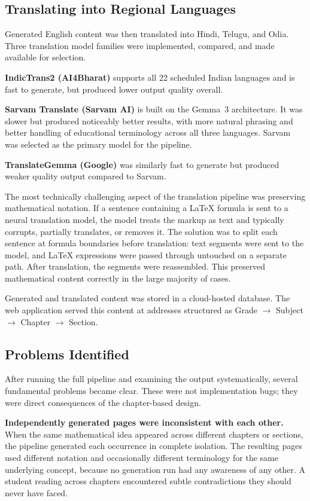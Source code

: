 \documentclass[12pt,a4paper]{article}
\begin{document}
\subsection{Translating into Regional Languages}

Generated English content was then translated into Hindi, Telugu, and Odia.
Three translation model families were implemented, compared, and made available
for selection.

\medskip
\noindent\textbf{IndicTrans2 (AI4Bharat)} supports all 22 scheduled Indian languages
and is fast to generate, but produced lower output quality overall.

\medskip
\noindent\textbf{Sarvam Translate (Sarvam AI)} is built on the Gemma~3 architecture.
It was slower but produced noticeably better results, with more natural phrasing
and better handling of educational terminology across all three languages.
Sarvam was selected as the primary model for the pipeline.

\medskip
\noindent\textbf{TranslateGemma (Google)} was similarly fast to generate
but produced weaker quality output compared to Sarvam.

\medskip
The most technically challenging aspect of the translation pipeline was preserving
mathematical notation.
If a sentence containing a \LaTeX{} formula is sent to a neural translation model,
the model treats the markup as text and typically corrupts, partially translates,
or removes it.
The solution was to split each sentence at formula boundaries before translation:
text segments were sent to the model, and \LaTeX{} expressions were passed through
untouched on a separate path.
After translation, the segments were reassembled.
This preserved mathematical content correctly in the large majority of cases.

Generated and translated content was stored in a cloud-hosted database.
The web application served this content at addresses structured as
Grade $\rightarrow$ Subject $\rightarrow$ Chapter $\rightarrow$ Section.

\subsection{Problems Identified}

After running the full pipeline and examining the output systematically,
several fundamental problems became clear.
These were not implementation bugs; they were direct consequences of the chapter-based design.

\medskip
\noindent\textbf{Independently generated pages were inconsistent with each other.}
When the same mathematical idea appeared across different chapters or sections,
the pipeline generated each occurrence in complete isolation.
The resulting pages used different notation and occasionally different terminology
for the same underlying concept, because no generation run had any awareness of any other.
A student reading across chapters encountered subtle contradictions they should never have faced.
\end{document}
